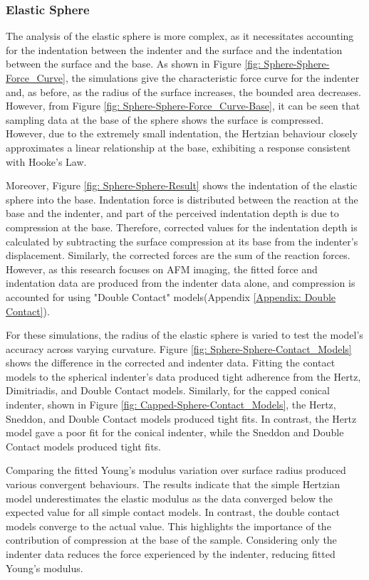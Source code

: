 \subsubsection{Elastic Sphere}

The analysis of the elastic sphere is more complex, as it necessitates accounting for the indentation between the indenter and the surface and the indentation between the surface and the base. As shown in Figure \ref{fig: Sphere-Sphere-Force_Curve}, the simulations give the characteristic force curve for the indenter and, as before, as the radius of the surface increases, the bounded area decreases. However, from Figure \ref{fig: Sphere-Sphere-Force_Curve-Base}, it can be seen that sampling data at the base of the sphere shows the surface is compressed. However, due to the extremely small indentation, the Hertzian behaviour closely approximates a linear relationship at the base, exhibiting a response consistent with Hooke's Law. 

Moreover, Figure \ref{fig: Sphere-Sphere-Result} shows the indentation of the elastic sphere into the base. Indentation force is distributed between the reaction at the base and the indenter, and part of the perceived indentation depth is due to compression at the base. Therefore, corrected values for the indentation depth is calculated by subtracting the surface compression at its base from the indenter's displacement. Similarly, the corrected forces are the sum of the reaction forces. However, as this research focuses on AFM imaging, the fitted force and indentation data are produced from the indenter data alone, and compression is accounted for using "Double Contact" models\cite{dokukin2013quantitative,glaubitz2014novel}(Appendix \ref{Appendix: Double Contact}).

 For these simulations, the radius of the elastic sphere is varied to test the model's accuracy across varying curvature. Figure \ref{fig: Sphere-Sphere-Contact_Models} shows the difference in the corrected and indenter data. Fitting the contact models to the spherical indenter's data produced tight adherence from the Hertz, Dimitriadis, and Double Contact models. Similarly, for the capped conical indenter, shown in Figure \ref{fig: Capped-Sphere-Contact_Models}, the Hertz, Sneddon, and Double Contact models produced tight fits. In contrast, the Hertz model gave a poor fit for the conical indenter, while the Sneddon and Double Contact models produced tight fits. 

Comparing the fitted Young's modulus variation over surface radius produced various convergent behaviours. The results indicate that the simple Hertzian model underestimates the elastic modulus as the data converged below the expected value for all simple contact models. In contrast, the double contact models converge to the actual value. This highlights the importance of the contribution of compression at the base of the sample. Considering only the indenter data reduces the force experienced by the indenter, reducing fitted Young's modulus.

